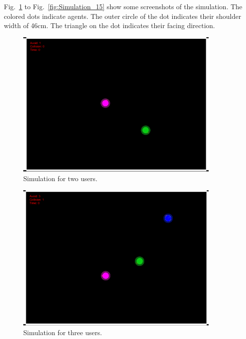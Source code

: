 \newpage

Fig.~\ref{fig:Simulation_2} to Fig.~\ref{fig:Simulation_15} show some screenshots of the simulation. The colored dots indicate agents. The outer circle of the dot indicates their shoulder width of 46cm. The triangle on the dot indicates their facing direction.

\begin{figure}[H]\centering
	\includegraphics[width=0.9\textwidth]{Pictures/two users share real space.png}%
	\caption{Simulation for two users.}\label{fig:Simulation_2}%
	
\end{figure}


\begin{figure}[H]\centering
	\includegraphics[width=0.9\textwidth]{Pictures/three users share real space.png}%
	\caption{Simulation for three users.}\label{fig:Simulation_3}%
	
\end{figure}


